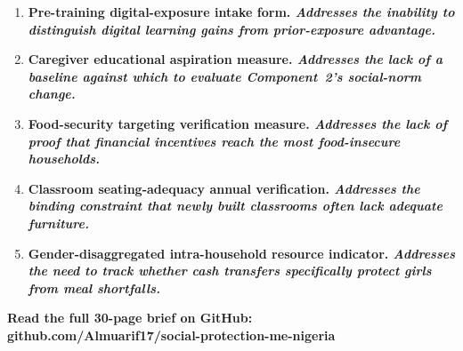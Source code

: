 \documentclass[11pt,landscape,letterpaper]{article}
\begin{document}
\begin{enumerate}[label={\color{gold}\bfseries\fontsize{14}{16}\selectfont\arabic*.},
                 itemsep=0.4cm, leftmargin=*, topsep=0pt]
  \item \fontsize{11.5}{16}\selectfont\bfseries
        Pre-training digital-exposure intake form.\hspace{0.25em}
        {\color{teal}\itshape\mdseries
        Addresses the inability to distinguish digital learning gains
        from prior-exposure advantage.}
  \item \fontsize{11.5}{16}\selectfont\bfseries
        Caregiver educational aspiration measure.\hspace{0.25em}
        {\color{teal}\itshape\mdseries
        Addresses the lack of a baseline against which to evaluate
        Component~2's social-norm change.}
  \item \fontsize{11.5}{16}\selectfont\bfseries
        Food-security targeting verification measure.\hspace{0.25em}
        {\color{teal}\itshape\mdseries
        Addresses the lack of proof that financial incentives reach
        the most food-insecure households.}
  \item \fontsize{11.5}{16}\selectfont\bfseries
        Classroom seating-adequacy annual verification.\hspace{0.25em}
        {\color{teal}\itshape\mdseries
        Addresses the binding constraint that newly built classrooms
        often lack adequate furniture.}
  \item \fontsize{11.5}{16}\selectfont\bfseries
        Gender-disaggregated intra-household resource indicator.\hspace{0.25em}
        {\color{teal}\itshape\mdseries
        Addresses the need to track whether cash transfers specifically
        protect girls from meal shortfalls.}
\end{enumerate}

\vfill
\begin{center}
  {\color{navy}\fontsize{12}{16}\selectfont\bfseries
  Read the full 30-page brief on GitHub: \\[0.15cm]
  github.com/Almuarif17/social-protection-me-nigeria}
\end{center}
\end{document}
